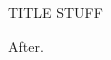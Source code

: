 \documentclass{report}
\def\titlepage{\par TITLE STUFF\par}
\begin{document}
{\titlepage}
After.
\end{document}
